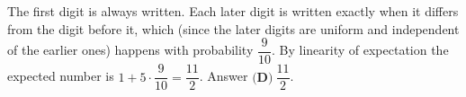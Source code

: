 The first digit is always written. Each later digit is written exactly when it differs from the digit before it, which (since the later digits are uniform and independent of the earlier ones) happens with probability $\dfrac9{10}$. By linearity of expectation the expected number is $1+5\cdot\dfrac9{10}=\dfrac{11}2$. Answer $\boxed{\textbf{(D)}\ \dfrac{11}2}$.

